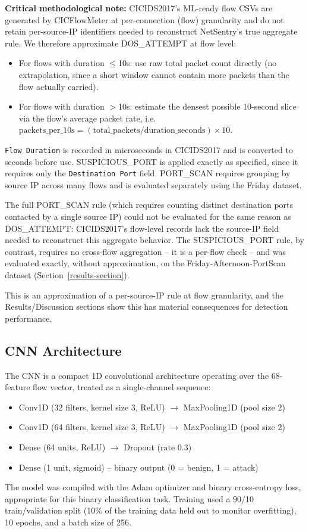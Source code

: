 \documentclass[conference]{IEEEtran}
\begin{document}
\textbf{Critical methodological note:} CICIDS2017's ML-ready flow CSVs are generated by CICFlowMeter at per-connection (flow) granularity and do not retain per-source-IP identifiers needed to reconstruct NetSentry's true aggregate rule. We therefore approximate DOS\_ATTEMPT at flow level:
\begin{itemize}
\item For flows with duration $\leq$10s: use raw total packet count directly (no extrapolation, since a short window cannot contain more packets than the flow actually carried).
\item For flows with duration $>$10s: estimate the densest possible 10-second slice via the flow's average packet rate, i.e. $\text{packets\_per\_10s} = (\text{total\_packets} / \text{duration\_seconds}) \times 10$.
\end{itemize}
\texttt{Flow Duration} is recorded in microseconds in CICIDS2017 and is converted to seconds before use. SUSPICIOUS\_PORT is applied exactly as specified, since it requires only the \texttt{Destination Port} field. PORT\_SCAN requires grouping by source IP across many flows and is evaluated separately using the Friday dataset.
 
The full PORT\_SCAN rule (which requires counting distinct destination ports contacted by a single source IP) could not be evaluated for the same reason as DOS\_ATTEMPT: CICIDS2017's flow-level records lack the source-IP field needed to reconstruct this aggregate behavior. The SUSPICIOUS\_PORT rule, by contrast, requires no cross-flow aggregation -- it is a per-flow check -- and was evaluated exactly, without approximation, on the Friday-Afternoon-PortScan dataset (Section~\ref{results-section}).
 
This is an approximation of a per-source-IP rule at flow granularity, and the Results/Discussion sections show this has material consequences for detection performance.
 
\subsection{CNN Architecture}
The CNN is a compact 1D convolutional architecture operating over the 68-feature flow vector, treated as a single-channel sequence:
\begin{itemize}
\item Conv1D (32 filters, kernel size 3, ReLU) $\rightarrow$ MaxPooling1D (pool size 2)
\item Conv1D (64 filters, kernel size 3, ReLU) $\rightarrow$ MaxPooling1D (pool size 2)
\item Dense (64 units, ReLU) $\rightarrow$ Dropout (rate 0.3)
\item Dense (1 unit, sigmoid) -- binary output (0 = benign, 1 = attack)
\end{itemize}
The model was compiled with the Adam optimizer and binary cross-entropy loss, appropriate for this binary classification task. Training used a 90/10 train/validation split (10\% of the training data held out to monitor overfitting), 10 epochs, and a batch size of 256.
 
\end{document}
